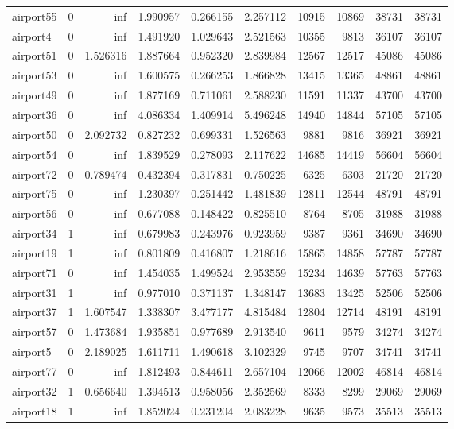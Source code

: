 \begin{longtable}{|l|r|r|r|r|r|r|r|r|r|}
airport55 & 0 & inf & 1.990957 & 0.266155 & 2.257112 & 10915 & 10869 & 38731 & 38731 \\
airport4 & 0 & inf & 1.491920 & 1.029643 & 2.521563 & 10355 & 9813 & 36107 & 36107 \\
airport51 & 0 & 1.526316 & 1.887664 & 0.952320 & 2.839984 & 12567 & 12517 & 45086 & 45086 \\
airport53 & 0 & inf & 1.600575 & 0.266253 & 1.866828 & 13415 & 13365 & 48861 & 48861 \\
airport49 & 0 & inf & 1.877169 & 0.711061 & 2.588230 & 11591 & 11337 & 43700 & 43700 \\
airport36 & 0 & inf & 4.086334 & 1.409914 & 5.496248 & 14940 & 14844 & 57105 & 57105 \\
airport50 & 0 & 2.092732 & 0.827232 & 0.699331 & 1.526563 & 9881 & 9816 & 36921 & 36921 \\
airport54 & 0 & inf & 1.839529 & 0.278093 & 2.117622 & 14685 & 14419 & 56604 & 56604 \\
airport72 & 0 & 0.789474 & 0.432394 & 0.317831 & 0.750225 & 6325 & 6303 & 21720 & 21720 \\
airport75 & 0 & inf & 1.230397 & 0.251442 & 1.481839 & 12811 & 12544 & 48791 & 48791 \\
airport56 & 0 & inf & 0.677088 & 0.148422 & 0.825510 & 8764 & 8705 & 31988 & 31988 \\
airport34 & 1 & inf & 0.679983 & 0.243976 & 0.923959 & 9387 & 9361 & 34690 & 34690 \\
airport19 & 1 & inf & 0.801809 & 0.416807 & 1.218616 & 15865 & 14858 & 57787 & 57787 \\
airport71 & 0 & inf & 1.454035 & 1.499524 & 2.953559 & 15234 & 14639 & 57763 & 57763 \\
airport31 & 1 & inf & 0.977010 & 0.371137 & 1.348147 & 13683 & 13425 & 52506 & 52506 \\
airport37 & 1 & 1.607547 & 1.338307 & 3.477177 & 4.815484 & 12804 & 12714 & 48191 & 48191 \\
airport57 & 0 & 1.473684 & 1.935851 & 0.977689 & 2.913540 & 9611 & 9579 & 34274 & 34274 \\
airport5 & 0 & 2.189025 & 1.611711 & 1.490618 & 3.102329 & 9745 & 9707 & 34741 & 34741 \\
airport77 & 0 & inf & 1.812493 & 0.844611 & 2.657104 & 12066 & 12002 & 46814 & 46814 \\
airport32 & 1 & 0.656640 & 1.394513 & 0.958056 & 2.352569 & 8333 & 8299 & 29069 & 29069 \\
airport18 & 1 & inf & 1.852024 & 0.231204 & 2.083228 & 9635 & 9573 & 35513 & 35513 \\

\end{longtable}
